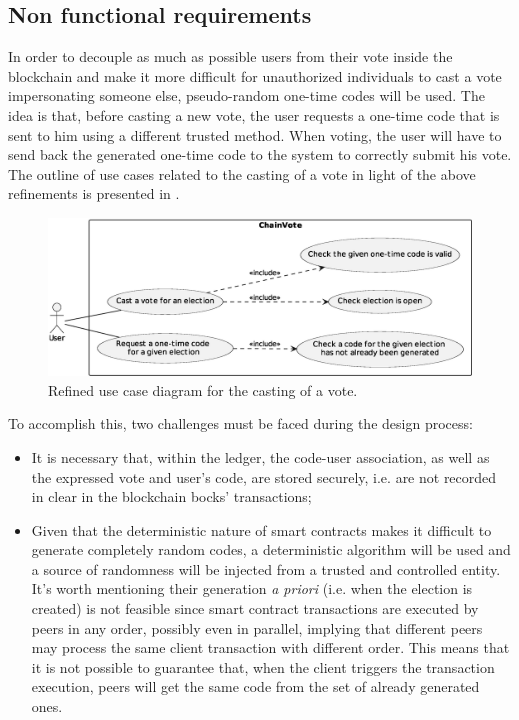 \documentclass{scrartcl}
\begin{document}
\subsection{Non functional requirements}
\label{sec:non-functional-requirements}

\iffalse

In order to decouple as much as possible users from their vote inside the blockchain and make it more difficult for unauthorized individuals to cast a vote impersonating someone else, pseudo-random one-time codes will be used.
%
The idea is that, before casting a new vote, the user requests a one-time code 
that is sent to him using a different trusted method.
%
When voting, the user will have to send back the generated one-time code to the system to correctly submit his vote.
%
The outline of use cases related to the casting of a vote in light of the above refinements is presented in .

\begin{figure}
    \centering
    \includegraphics[width=\linewidth]{figures/refined-cast-vote-use-case.eps}
    \caption{Refined use case diagram for the casting of a vote.}
    \label{fig:refined-cast-vote-use-case}
\end{figure}

To accomplish this, two challenges must be faced during the design process:

\begin{itemize}
    \item It is necessary that, within the ledger, the code-user association, as well as the expressed vote and user's code, are stored securely, i.e. are not recorded in clear in the blockchain bocks' transactions;
    \item Given that the deterministic nature of smart contracts makes it difficult to generate completely random codes, a deterministic algorithm will be used and a source of randomness will be injected from a trusted and controlled entity. It's worth mentioning their generation \textit{a priori} (i.e. when the election is created) is not feasible since smart contract transactions are executed by peers in any order, possibly even in parallel, implying that different peers may process the same client transaction with different order. This means that it is not possible to guarantee that, when the client triggers the transaction execution, peers will get the same code from the set of already generated ones.
\end{itemize}
\end{document}
